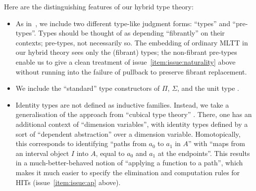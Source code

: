\documentclass{amsart}
\begin{document}
Here are the distinguishing features of our hybrid type theory:
\begin{itemize}
\item As in~\cite{vv:hts}, we include two different type-like judgment forms: ``types'' and ``pre-types''.
  Types should be thought of as depending ``fibrantly'' on their contexts; pre-types, not necessarily so.
  The embedding of ordinary MLTT in our hybrid theory sees only the (fibrant) types; the non-fibrant pre-types enable us to give a clean treatment of issue~\ref{item:issue:naturality} above without running into the failure of pullback to preserve fibrant replacement.
\item We include the ``standard'' type constructors of $\Pi$, $\Sigma$, and the unit type \unittype. 
\item Identity types are not defined as inductive families.
  Instead, we take a generalisation of the approach from ``cubical type theory'' \cite{lb:cubical-tt}.
  There, one has an additional context of ``dimension variables'', with identity types defined by a sort of ``dependent abstraction'' over a dimension variable.
  Homotopically, this corresponds to identifying ``paths from $a_0$ to $a_1$ in $A$'' with ``maps from an interval object $I$ into $A$, equal to $a_0$ and $a_1$ at the endpoints''.
  This results in a much-better-behaved notion of ``applying a function to a path'', which makes it much easier to specify the elimination and computation rules for HITs (issue~\ref{item:issue:ap} above).


\end{itemize}
\end{document}

